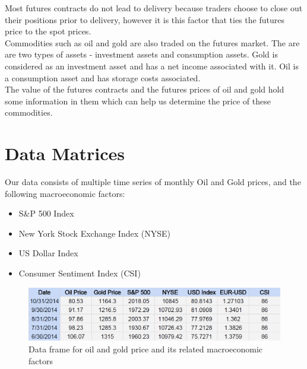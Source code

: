 \documentclass[runningheads]{llncs}
\begin{document}
\noindent Most futures contracts do not lead to delivery because traders choose to close out their positions prior to delivery, however it is this factor that ties the futures price to the spot prices. \\

\noindent Commodities such as oil and gold are also traded on the futures market. The are are two types of assets - investment assets and consumption assets. Gold is considered as an investment asset and has a net income associated with it. Oil is a consumption asset and has storage costs associated.\\

\noindent The value of the futures contracts and the futures prices of oil and gold hold some information in them which can help us determine the price of these commodities.  

\newpage
\section{Data Matrices}
Our data consists of multiple time series of monthly Oil and Gold prices\cite{quandal}, and the following macroeconomic factors:

\begin {itemize}
\item S\&P 500 Index \cite{quandal}
\item New York Stock Exchange Index (NYSE) \cite{quandal}
\item US Dollar Index \cite{quandal}
\item Consumer Sentiment Index (CSI) \cite{csi}
\end {itemize}
 
\begin{figure}
\centering
\includegraphics[width=\textwidth]{DataMatrices.png}
\caption{Data frame for oil and gold price and its related macroeconomic factors}
\label{fig:DataMatrices.png}
\end{figure}
\end{document}
